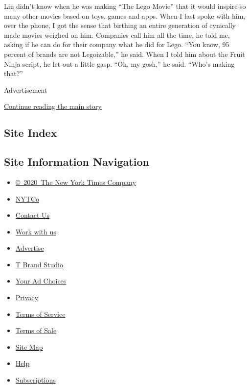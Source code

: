 Lin didn't know when he was making ``The Lego Movie'' that it would
inspire so many other movies based on toys, games and apps. When I last
spoke with him, over the phone, I got the sense that birthing an entire
generation of cynically made movies weighed on him. Companies call him
all the time, he told me, asking if he can do for their company what he
did for Lego. ``You know, 95 percent of brands are not Legoizable,'' he
said. When I told him about the Fruit Ninja script, he let out a little
gasp. ``Oh, my gosh,'' he said. ``Who's making that?''

Advertisement

\protect\hyperlink{after-bottom}{Continue reading the main story}

\hypertarget{site-index}{%
\subsection{Site Index}\label{site-index}}

\hypertarget{site-information-navigation}{%
\subsection{Site Information
Navigation}\label{site-information-navigation}}

\begin{itemize}
\tightlist
\item
  \href{https://help.nytimes3xbfgragh.onion/hc/en-us/articles/115014792127-Copyright-notice}{©~2020~The
  New York Times Company}
\end{itemize}

\begin{itemize}
\tightlist
\item
  \href{https://www.nytco.com/}{NYTCo}
\item
  \href{https://help.nytimes3xbfgragh.onion/hc/en-us/articles/115015385887-Contact-Us}{Contact
  Us}
\item
  \href{https://www.nytco.com/careers/}{Work with us}
\item
  \href{https://nytmediakit.com/}{Advertise}
\item
  \href{http://www.tbrandstudio.com/}{T Brand Studio}
\item
  \href{https://www.nytimes3xbfgragh.onion/privacy/cookie-policy\#how-do-i-manage-trackers}{Your
  Ad Choices}
\item
  \href{https://www.nytimes3xbfgragh.onion/privacy}{Privacy}
\item
  \href{https://help.nytimes3xbfgragh.onion/hc/en-us/articles/115014893428-Terms-of-service}{Terms
  of Service}
\item
  \href{https://help.nytimes3xbfgragh.onion/hc/en-us/articles/115014893968-Terms-of-sale}{Terms
  of Sale}
\item
  \href{https://spiderbites.nytimes3xbfgragh.onion}{Site Map}
\item
  \href{https://help.nytimes3xbfgragh.onion/hc/en-us}{Help}
\item
  \href{https://www.nytimes3xbfgragh.onion/subscription?campaignId=37WXW}{Subscriptions}
\end{itemize}
